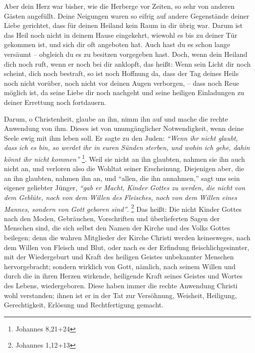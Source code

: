 Aber dein Herz war bisher, wie die Herberge vor Zeiten, so sehr von anderen
Gästen angefüllt. Deine Neigungen waren so eifrig auf andere Gegenstände deiner
Liebe gerichtet, dass für deinen Heiland kein Raum in dir übrig war. Darum ist
das Heil noch nicht in deinem Hause eingekehrt, wiewohl es bis zu deiner Tür
gekommen ist, und sich dir oft angeboten hat. Auch hast du es schon lange
versäumt -- obgleich du es zu besitzen vorgegeben hast. Doch, wenn dein Heiland
dich noch ruft, wenn er noch bei dir anklopft, das heißt: Wenn sein Licht dir
noch scheint, dich noch bestraft, so ist noch Hoffnung da, dass der Tag deines
Heils noch nicht vorüber, noch nicht vor deinen Augen verborgen, -- dass noch
Reue
möglich ist, da seine Liebe dir noch nachgeht und seine heiligen Einladungen
zu deiner Errettung noch fortdauern.

Darum, o Christenheit, glaube an ihn, nimm ihn auf und mache die rechte
Anwendung von ihm. Dieses ist von unumgänglicher Notwendigkeit, wenn deine
Seele ewig mit ihm leben soll.
Er sagte zu den Juden:
\textit{"`Wenn ihr nicht glaubt, dass ich es bin, so werdet ihr in euren Sünden
sterben, und wohin ich gehe, dahin könnt ihr nicht kommen"'}
\footnote{Johannes 8,21+24}.
 Weil sie nicht an ihn 
glaubten, nahmen sie ihn auch nicht an, und verloren also die Wohltat seiner
Erscheinung. Diejenigen aber, die an ihn glaubten, nahmen ihn an, und "`allen,
die ihn annahmen,"' sagt uns sein eigener geliebter Jünger,
\textit{"`gab er Macht, Kinder Gottes zu werden, die nicht von dem Geblüte, noch
von dem Willen des Fleisches, noch von dem Willen eines Mannes, sondern von Gott
geboren sind"'}.
\footnote{Johannes 1,12+13}
Das heißt: Die nicht Kinder Gottes nach den
Moden, Gebräuchen, Vorschriften und überlieferten Sagen der Menschen sind, die
sich selbst den Namen der Kirche und des Volks Gottes beilegen; denn die wahren
Mitglieder der Kirche Christi werden keinesweges, nach dem Willen von Fleisch
und Blut, oder nach es der Erfindung fleischlichgesinnter, mit der Wiedergeburt
und Kraft des heiligen Geistes unbekannter Menschen hervorgebracht; sondern
wirklich von Gott, nämlich, nach seinem Willen und durch die in ihren Herzen
wirkende, heiligende Kraft seines Geistes und Wortes des Lebens, wiedergeboren.
Diese haben immer die rechte Anwendung Christi wohl verstanden; ihnen ist er in
der Tat zur Versöhnung, Weisheit, Heiligung, Gerechtigkeit, Erlösung und
Rechtfertigung gemacht.

